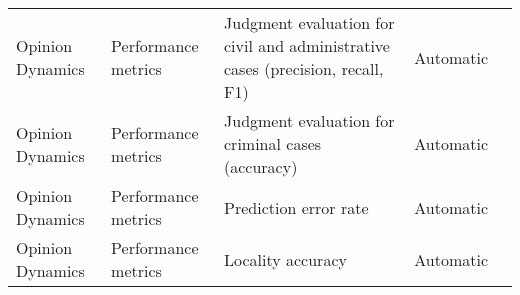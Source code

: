 \begin{small}
\begin{center}
\begin{longtable}{@{}p{}p{}p{}p{}p{}@{}}
Opinion Dynamics         & Performance metrics                 & Judgment evaluation for civil and administrative cases (precision, recall, F1)                                                                                                                              & Automatic & \cite{He2024AgentsCourtBJ}                                                                                                                                                                                                                                                                                                                                                                                \\
Opinion Dynamics         & Performance metrics                 & Judgment evaluation for criminal cases (accuracy)                                                                                                                                                           & Automatic & \cite{He2024AgentsCourtBJ}                                                                                                                                                                                                                                                                                                                                                                                \\
Opinion Dynamics         & Performance metrics                 & Prediction error rate                                                                                                                                                                                       & Automatic & \cite{Gao2023S3SS}                                                                                                                                                                                                                                                                                                                                                                                                  \\
Opinion Dynamics         & Performance metrics                 & Locality accuracy                                                                                                                                                                                           & Automatic & \cite{Ju2024FloodingSO}                                                                                                                                                                                                                                                                                                                                                                                                \\

\end{longtable}
\end{center}
\end{small}
